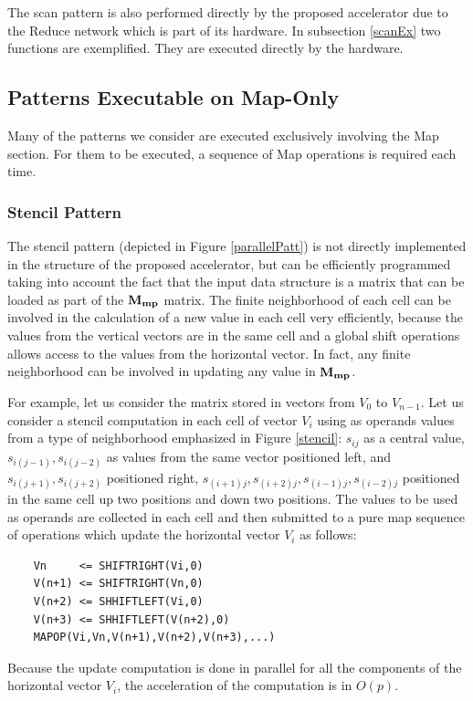  The scan pattern is also performed directly by the proposed accelerator due to the Reduce network which is part of its hardware. In subsection \ref{scanEx} two functions are exemplified. They are executed directly by the hardware.
 
\subsection{Patterns Executable on Map-Only}

Many of the patterns we consider are executed exclusively involving the Map section. For them to be executed, a sequence of Map operations is required each time.

\subsubsection{Stencil Pattern}

The stencil pattern (depicted in  Figure \ref{parallelPatt}) is not directly implemented in the structure of the proposed accelerator, but can be efficiently programmed taking into account the fact that the input data structure is a matrix that can be loaded as part of the ${\bf M_{mp}}$ matrix. The finite neighborhood of each cell can be involved in the calculation of a new value in each cell very efficiently, because the values from the vertical vectors are in the same cell and a global shift operations allows access to the values from the horizontal vector. In fact, any finite neighborhood can be involved in updating  any value in ${\bf M_{mp}}$.

For example, let us consider the matrix stored in vectors from $V_0$ to $V_{n-1}$. Let us  consider a stencil computation in each cell of vector $V_i$ using as operands values from a type of neighborhood emphasized in Figure \ref{stencil}: $s_{ij}$ as a central value, $s_{i(j-1)}, s_{i(j-2)}$ as values from the same vector positioned left, and $s_{i(j+1)}, s_{i(j+2)}$ positioned right, $s_{(i+1)j}, s_{(i+2)j}, s_{(i-1)j}, s_{(i-2)j}$ positioned in the same cell up two positions and down two positions.  The values to be used as operands are collected  in each cell and then submitted to a pure map sequence of operations which update the horizontal vector $V_i$ as follows:
\begin{verbatim}
    Vn     <= SHIFTRIGHT(Vi,0)
    V(n+1) <= SHIFTRIGHT(Vn,0)
    V(n+2) <= SHHIFTLEFT(Vi,0)
    V(n+3) <= SHHIFTLEFT(V(n+2),0)
    MAPOP(Vi,Vn,V(n+1),V(n+2),V(n+3),...)
\end{verbatim}
Because the update computation is done in parallel  for all the components of the horizontal vector $V_i$, the acceleration of the computation is in $O(p)$.

